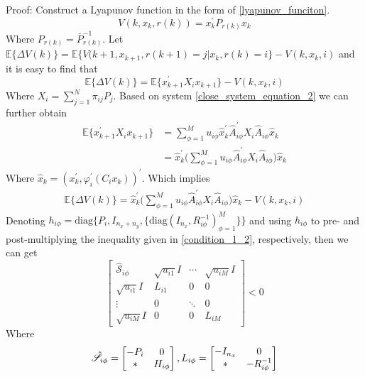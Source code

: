 \documentclass[conference]{IEEEtran}
\begin{document}
Proof: Construct a Lyapunov function in the form of \eqref{lyapunov_funciton}.
\begin{equation}\label{lyapunov_funciton} 
	V(k,x_k,r(k))=x^{'}_{k}P_{r(k)}x_{k}
\end{equation}
Where $P_{r(k)}=\bar{P}^{-1}_{r(k)}$. Let $\mathbb{E}\{\varDelta V(k)\}=\mathbb{E}\{V(k+1,x_{k+1},r(k+1)=j|x_k,r(k)=i \}-V(k,x_k,i)$ and it is easy to find that
\begin{equation} \label{lypfunction}
	\mathbb{E}\{\varDelta V(k)\}=\mathbb{E}\{x^{'}_{k+1}X_{i} x_{k+1} \}-V(k,x_k,i)
\end{equation} 
Where $X_{i} = \sum_{j=1}^{N}\pi_{ij}P_{j}$. Based on system \eqref{close_system_equation_2} we can further obtain \\
\begin{equation}
	\begin{split}
		\mathbb{E}\{x^{'}_{k+1}X_{i} x_{k+1} \}& = \sum_{\phi=1}^{M} u_{i\phi} \hat{x}^{'}_{k} \hat{A}^{'}_{i\phi}X_{i}\hat{A}_{i\phi}\hat{x}_{k}\\
		&=\hat{x}^{'}_{k} \Big( \sum_{\phi=1}^{M}u_{i\phi}\hat{A}^{'}_{i\phi}X_{i}\hat{A}_{i\phi}\Big) \hat{x}_{k} 
	\end{split}
\end{equation}
Where $\hat{x}_{k}=(x^{'}_k,\varphi^{'}_{i}(C_{i}x_{k}))^{'}$. Which implies
\begin{equation} \label{leq18}
	\begin{split}
		\mathbb{E}\{\varDelta V(k)\}=\hat{x}^{'}_{k} \Big( \sum_{\phi=1}^{M}u_{i\phi}\hat{A}^{'}_{i\phi}X_{i}\hat{A}_{i\phi}\Big) \hat{x}_{k} -V(k,x_k,i)
	\end{split}
\end{equation}
Denoting $h_{i\phi} = \mathrm{diag}\{P_{i}, I_{n_x+n_y},\{\mathrm{diag}(I_{n_x},R^{-1}_{i\phi})^{M}_{\phi=1} \} \}$ and using $h_{i\phi}$ to pre- and post-multiplying the inequality given in \eqref{condition_1_2}, respectively, then we can get \\
\begin{equation}\nonumber
\begin{bmatrix} 
	\hat{\mathscr{S}}_{i\phi}&
\sqrt{u_{i1}}I&
\cdots&
\sqrt{u_{iM}}I\\
\sqrt{u_{i1}}I&L_{i1}&0&0\\ 
\vdots&0&\ddots&0\\
\sqrt{u_{iM}}I&0&0&
L_{iM}

\end{bmatrix} <0
\end{equation}
Where 
\begin{equation} \notag
	\begin{aligned}
		\hat{\mathscr{S}}_{i\phi}=\begin{bmatrix}
			-P_{i }&0\\
			*&H_{i\phi}
		\end{bmatrix},
		L_{i\phi} = \begin{bmatrix}
			-I_{n_x}&0\\
			*&-R^{-1}_{i\phi}
		\end{bmatrix}
	\end{aligned}
\end{equation}
\end{document}
